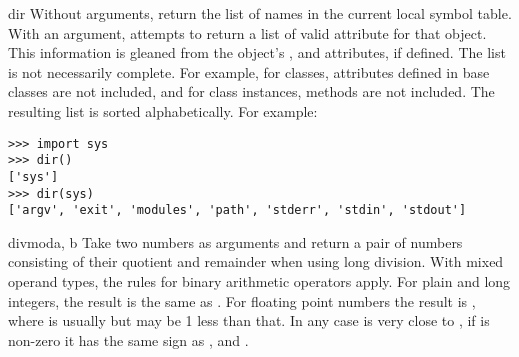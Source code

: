 \begin{funcdesc}{dir}{}
  Without arguments, return the list of names in the current local
  symbol table.  With an argument, attempts to return a list of valid
  attribute for that object.  This information is gleaned from the
  object's ,  and 
  attributes, if defined.  The list is not necessarily complete.  For
  example, for classes, attributes defined in base classes are not
  included, and for class instances, methods are not included.
  The resulting list is sorted alphabetically.  For example:

\begin{verbatim}
>>> import sys
>>> dir()
['sys']
>>> dir(sys)
['argv', 'exit', 'modules', 'path', 'stderr', 'stdin', 'stdout']
\end{verbatim}
\end{funcdesc}

\begin{funcdesc}{divmod}{a, b}
  Take two numbers as arguments and return a pair of numbers consisting
  of their quotient and remainder when using long division.  With mixed
  operand types, the rules for binary arithmetic operators apply.  For
  plain and long integers, the result is the same as
  .
  For floating point numbers the result is , where  is usually  but may be 1 less than that.  In any case  is very close to , if
   is non-zero it has the same sign as
  , and .
\end{funcdesc}

